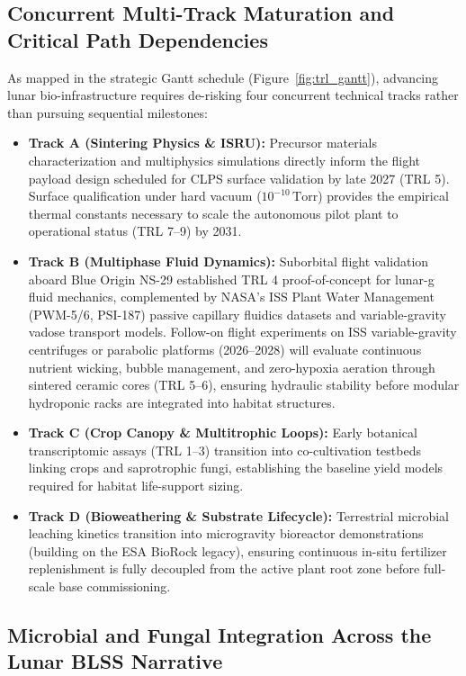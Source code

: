 \subsection{Concurrent Multi-Track Maturation and Critical Path Dependencies}
As mapped in the strategic Gantt schedule (Figure~\ref{fig:trl_gantt}), advancing lunar bio-infrastructure requires de-risking four concurrent technical tracks rather than pursuing sequential milestones:
\begin{itemize}
    \item \textbf{Track A (Sintering Physics \& ISRU):} Precursor materials characterization and multiphysics simulations directly inform the flight payload design scheduled for CLPS surface validation by late 2027 (TRL 5). Surface qualification under hard vacuum ($10^{-10}\,\mathrm{Torr}$) provides the empirical thermal constants necessary to scale the autonomous pilot plant to operational status (TRL 7--9) by 2031.
    \item \textbf{Track B (Multiphase Fluid Dynamics):} Suborbital flight validation aboard Blue Origin NS-29 established TRL 4 proof-of-concept for lunar-g fluid mechanics\cite{hasenstein2026assessing}, complemented by NASA's ISS Plant Water Management (PWM-5/6, PSI-187) passive capillary fluidics datasets\cite{weislogel2026pwm,hatch2022pwm,pwm2020ntrs} and variable-gravity vadose transport models\cite{jones2012beyond}. Follow-on flight experiments on ISS variable-gravity centrifuges or parabolic platforms (2026--2028) will evaluate continuous nutrient wicking, bubble management, and zero-hypoxia aeration through sintered ceramic cores (TRL 5--6), ensuring hydraulic stability before modular hydroponic racks are integrated into habitat structures.
    \item \textbf{Track C (Crop Canopy \& Multitrophic Loops):} Early botanical transcriptomic assays (TRL 1--3) transition into co-cultivation testbeds linking crops and saprotrophic fungi, establishing the baseline yield models required for habitat life-support sizing.
    \item \textbf{Track D (Bioweathering \& Substrate Lifecycle):} Terrestrial microbial leaching kinetics transition into microgravity bioreactor demonstrations (building on the ESA BioRock legacy), ensuring continuous in-situ fertilizer replenishment is fully decoupled from the active plant root zone before full-scale base commissioning.
\end{itemize}

\subsection{Microbial and Fungal Integration Across the Lunar BLSS Narrative}
\label{subsec:microbial_fungal_roadmap}


